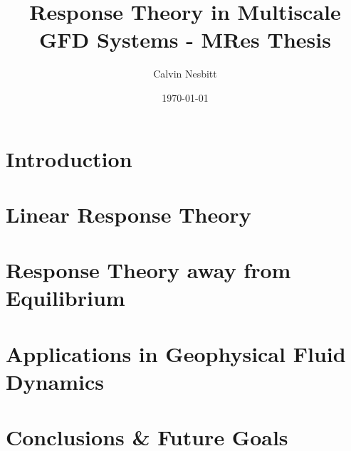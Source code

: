 \documentclass[11pt,letterpaper,oneside]{report}
\title{Response Theory in Multiscale GFD Systems - MRes Thesis}
\date{\today}
\author{Calvin Nesbitt}
\begin{document}
\maketitle

\tableofcontents 

\cleardoublepage

\chapter{Introduction}

\chapter{Linear Response Theory} \label{Chapter:LRT}





\chapter{Response Theory away from Equilibrium}





\chapter{Applications in Geophysical Fluid Dynamics} \label{Chapter Applications}




\chapter{Conclusions \& Future Goals}

\clearpage 

\end{document}
